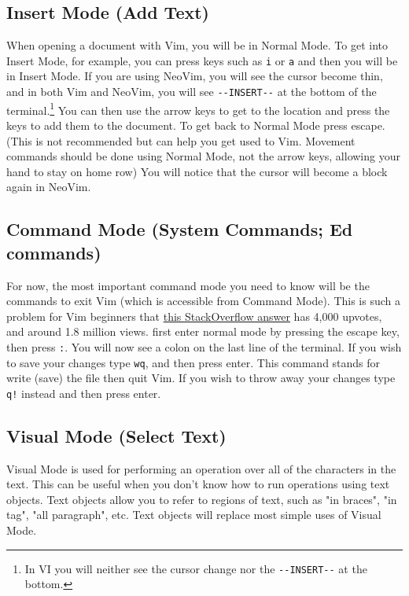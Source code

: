 \documentclass[11pt]{article}
\begin{document}
\subsection{Insert Mode (Add Text)}
\label{sec:org20013c7}
When opening a document with Vim, you will be in Normal Mode. To get into Insert
Mode, for example, you can press keys such as \texttt{i} or \texttt{a} and then you will be in
Insert Mode. If you are using NeoVim, you will see the cursor become thin, and
in both Vim and NeoVim, you will see \texttt{-{}-INSERT-{}-} at the bottom of the
terminal.\footnote{In VI you will neither see the cursor change nor the 
\texttt{-{}-INSERT-{}-} at the bottom.} You can then use the arrow keys to get to the location and press
the keys to add them to the document. To get back to Normal Mode press escape.
(This is not recommended but can help you get used to Vim. Movement commands
should be done using Normal Mode, not the arrow keys, allowing your hand to stay
on home row) You will notice that the cursor will become a block again in
NeoVim.
\subsection{Command Mode (System Commands; Ed commands)}
\label{sec:orgaf641c5}
For now, the most important command mode you need to know will be the commands
to exit Vim (which is accessible from Command Mode). This is such a problem for
Vim beginners that \href{https://stackoverflow.com/questions/11828270/how-to-exit-the-vim-editor}{this StackOverflow answer} has 4,000 upvotes, and around 1.8
million views. first enter normal mode by pressing the escape key, then press
\texttt{:}. You will now see a colon on the last line of the terminal. If you wish to
save your changes type \texttt{wq}, and then press enter. This command stands for write
(save) the file then quit Vim. If you wish to throw away your changes type \texttt{q!}
instead and then press enter.
\subsection{Visual Mode (Select Text)}
\label{sec:orgf055478}
Visual Mode is used for performing an operation over all of the characters in
the text. This can be useful when you don't know how to run operations using
text objects. Text objects allow you to refer to regions of text, such as "in
braces", "in tag", "all paragraph", etc. Text objects will replace most simple
uses of Visual Mode.
\end{document}
